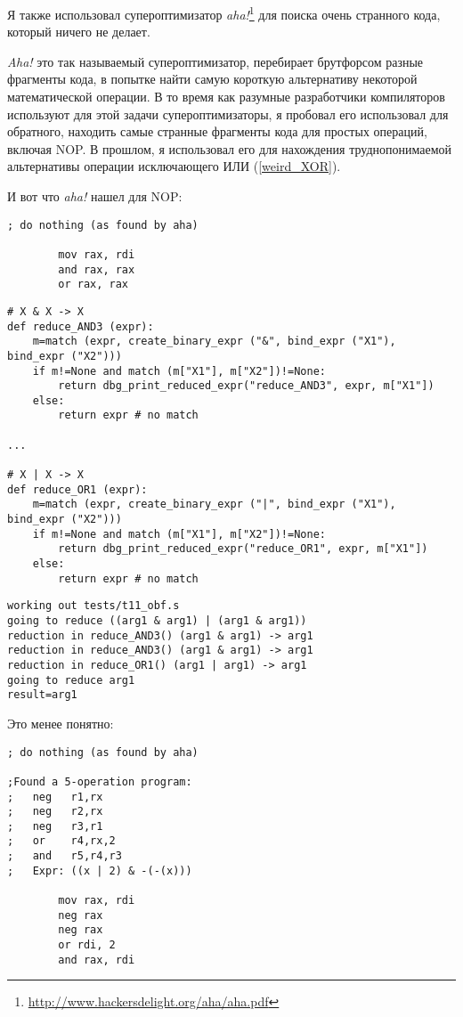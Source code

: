 Я также использовал супероптимизатор \textit{aha!}\footnote{\url{http://www.hackersdelight.org/aha/aha.pdf}}
для поиска очень странного кода, который ничего не делает.

\textit{Aha!} это так называемый супероптимизатор, перебирает брутфорсом разные фрагменты кода, в попытке найти
самую короткую альтернативу некоторой математической операции.
В то время как разумные разработчики компиляторов используют для этой задачи супероптимизаторы, я пробовал его
использовал для обратного, находить самые странные фрагменты кода для простых операций, включая \ac{NOP}.
В прошлом, я использовал его для нахождения труднопонимаемой альтернативы операции исключающего ИЛИ (\ref{weird_XOR}).

И вот что \textit{aha!} нашел для \ac{NOP}:

\begin{lstlisting}
; do nothing (as found by aha)

        mov rax, rdi
        and rax, rax
        or rax, rax
\end{lstlisting}

\begin{lstlisting}
# X & X -> X
def reduce_AND3 (expr):
    m=match (expr, create_binary_expr ("&", bind_expr ("X1"), bind_expr ("X2")))
    if m!=None and match (m["X1"], m["X2"])!=None:
        return dbg_print_reduced_expr("reduce_AND3", expr, m["X1"])
    else:
        return expr # no match

...

# X | X -> X
def reduce_OR1 (expr):
    m=match (expr, create_binary_expr ("|", bind_expr ("X1"), bind_expr ("X2")))
    if m!=None and match (m["X1"], m["X2"])!=None:
        return dbg_print_reduced_expr("reduce_OR1", expr, m["X1"])
    else:
        return expr # no match
\end{lstlisting}

\begin{lstlisting}
working out tests/t11_obf.s
going to reduce ((arg1 & arg1) | (arg1 & arg1))
reduction in reduce_AND3() (arg1 & arg1) -> arg1
reduction in reduce_AND3() (arg1 & arg1) -> arg1
reduction in reduce_OR1() (arg1 | arg1) -> arg1
going to reduce arg1
result=arg1
\end{lstlisting}

Это менее понятно:

\begin{lstlisting}
; do nothing (as found by aha)

;Found a 5-operation program:
;   neg   r1,rx
;   neg   r2,rx
;   neg   r3,r1
;   or    r4,rx,2
;   and   r5,r4,r3
;   Expr: ((x | 2) & -(-(x)))

        mov rax, rdi
        neg rax
        neg rax
        or rdi, 2
        and rax, rdi
\end{lstlisting}

